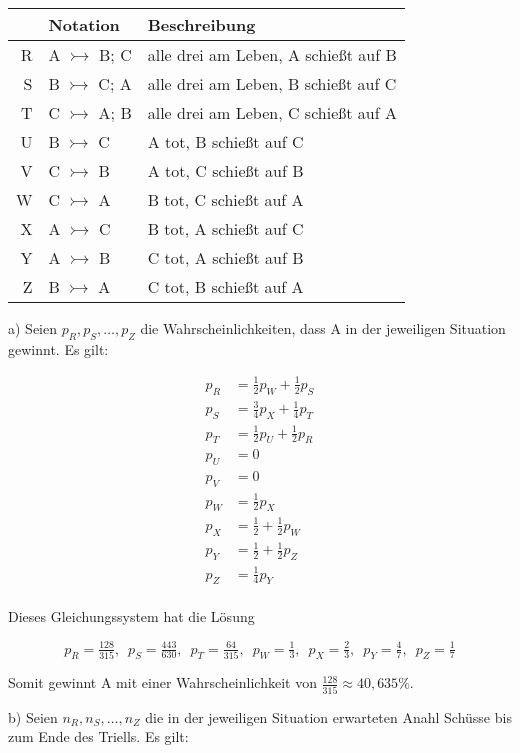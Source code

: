 \documentclass{article}
\begin{document}
\begin{tabular}{r|l|l}
  & Notation & Beschreibung \\ \hline
  R & A $\rightarrowtail$ B; C & alle drei am Leben, A schießt auf B \\
  S & B $\rightarrowtail$ C; A & alle drei am Leben, B schießt auf C \\
  T & C $\rightarrowtail$ A; B & alle drei am Leben, C schießt auf A \\
  U & B $\rightarrowtail$ C & A tot, B schießt auf C \\
  V & C $\rightarrowtail$ B & A tot, C schießt auf B \\
  W & C $\rightarrowtail$ A & B tot, C schießt auf A \\
  X & A $\rightarrowtail$ C & B tot, A schießt auf C \\
  Y & A $\rightarrowtail$ B & C tot, A schießt auf B \\
  Z & B $\rightarrowtail$ A & C tot, B schießt auf A
\end{tabular}

a) Seien $p_R, p_S, \ldots, p_Z$ die Wahrscheinlichkeiten, dass A in der jeweiligen Situation gewinnt. Es gilt:

\begin{align*}
  p_R & = \tfrac{1}{2} p_W + \tfrac{1}{2} p_S \\
  p_S & = \tfrac{3}{4} p_X + \tfrac{1}{4} p_T \\
  p_T & = \tfrac{1}{2} p_U + \tfrac{1}{2} p_R \\
  p_U & = 0 \\
  p_V & = 0 \\
  p_W & = \tfrac{1}{2} p_X \\
  p_X & = \tfrac{1}{2} + \tfrac{1}{2} p_W \\
  p_Y & = \tfrac{1}{2} + \tfrac{1}{2} p_Z \\
  p_Z & = \tfrac{1}{4} p_Y \\
\end{align*}

Dieses Gleichungssystem hat die Lösung

\[
  p_R = \tfrac{128}{315}, \enspace
  p_S = \tfrac{443}{630}, \enspace
  p_T = \tfrac{64}{315}, \enspace
  p_W = \tfrac{1}{3}, \enspace
  p_X = \tfrac{2}{3}, \enspace
  p_Y = \tfrac{4}{7}, \enspace
  p_Z = \tfrac{1}{7}
\]

Somit gewinnt A mit einer Wahrscheinlichkeit von $\tfrac{128}{315} \approx 40,635 \%$.

b) Seien $n_R, n_S, \ldots, n_Z$ die in der jeweiligen Situation erwarteten Anahl Schüsse bis zum Ende des Triells. Es gilt:
\end{document}
